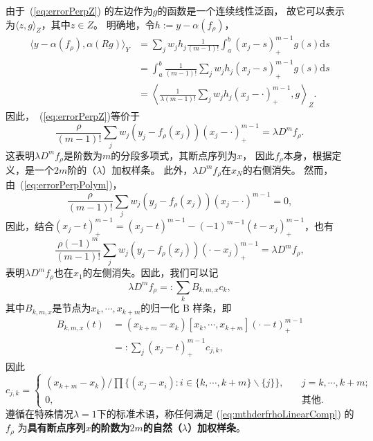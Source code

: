由于~(\ref{eq:errorPerpZ}) 的左边作为$g$的函数是一个连续线性泛函，
故它可以表示为$\langle z,g \rangle_{Z}$，其中$z\in Z$。
明确地，令$h:=y-\alpha(f_{\rho})$，
\begin{align*}
  \langle y-\alpha(f_{\rho}),\alpha(Rg) \rangle_{Y}
  &=\sum_{j}w_{j}h_{j}
    \frac{1}{(m-1)!}\int_{a}^{b}(x_{j}-s)_{+}^{m-1}g(s)\mathrm{d}s\\
  &=\int_{a}^{b}\frac{1}{(m-1)!}\sum_{j}w_{j}h_{j}(x_{j}-s)_{+}^{m-1}
    g(s)\mathrm{d}s\\
  &=\left\langle \frac{1}{\lambda (m-1)!}
    \sum_{j}w_{j}h_{j}(x_{j}-\cdot)_{+}^{m-1},g\right\rangle_{Z}.
\end{align*}
因此，~(\ref{eq:errorPerpZ})等价于
\begin{equation}
  \label{eq:mthderfrho}
  \frac{\rho}{(m-1)!}\sum_{j}
  w_{j}(y_{j}-f_{\rho}(x_{j}))(x_{j}-\cdot)_{+}^{m-1}
  =\lambda D^{m}f_{\rho}.
\end{equation}
这表明$\lambda D^{m}f_{\rho}$是阶数为$m$的分段多项式，其断点序列为$x$，
因此$f_{\rho}$本身，根据定义，是一个$2m$阶的（$\lambda$）加权样条。
此外，$\lambda D^{m}f_{\rho}$在$x_{N}$的右侧消失。
然而，由~(\ref{eq:errorPerpPolym})，
\begin{displaymath}
  \frac{\rho}{(m-1)!}\sum_{j}
  w_{j}(y_{j}-f_{\rho}(x_{j}))(x_{j}-\cdot)^{m-1}=0,
\end{displaymath}
因此，结合$(x_{j}-t)_{+}^{m-1}
=(x_{j}-t)^{m-1}-(-1)^{m-1}(t-x_{j})_{+}^{m-1}$，也有
\begin{equation}
  \label{eq:mthderfrhoEquiv}
  \frac{\rho (-1)^{m}}{(m-1)!}\sum_{j}
  w_{j}(y_{j}-f_{\rho}(x_{j}))(\cdot-x_{j})_{+}^{m-1}
  =\lambda D^{m}f_{\rho},
\end{equation}
表明$\lambda D^{m}f_{\rho}$也在$x_{1}$的左侧消失。因此，我们可以记
\begin{equation}
  \label{eq:mthderfrhoLinearComp}
  \lambda D^{m}f_{\rho}=:\sum_{k}B_{k,m,x}c_{k},
\end{equation}
其中$B_{k,m,x}$是节点为$x_{k},\cdots,x_{k+m}$的归一化 B 样条，即
\begin{displaymath}
  \begin{aligned}
    B_{k,m,x}(t)
    &=(x_{k+m}-x_{k})[x_{k},\cdots,x_{k+m}](\cdot - t)_{+}^{m-1}\\
    &=:\sum_{j}(x_{j}-t)_{+}^{m-1}c_{j,k},
  \end{aligned}
\end{displaymath}
因此
\begin{displaymath}
  c_{j,k}=
    \begin{cases}
      (x_{k+m}-x_k)/{\prod\{ (x_{j}-x_{i}):i\in\{k,\cdots,k+m\}
      \backslash\{j\} \}}, \quad &j=k,\cdots,k+m;\\
      0,\quad&\text{其他}.
    \end{cases}
\end{displaymath}
遵循在特殊情况$\lambda=1$下的标准术语，称任何满足
(\ref{eq:mthderfrhoLinearComp}) 的$f_{\rho}$
为\textbf{具有断点序列$x$的阶数为$2m$的自然（$\lambda$）加权样条}。

